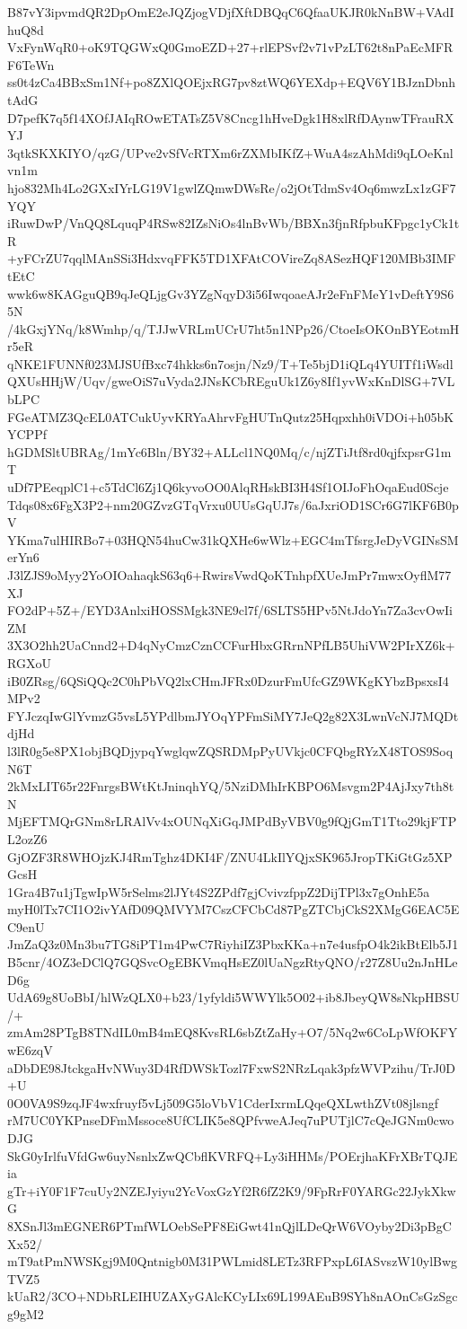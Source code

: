 B87vY3ipvmdQR2DpOmE2eJQZjogVDjfXftDBQqC6QfaaUKJR0kNnBW+VAdIhuQ8d
VxFynWqR0+oK9TQGWxQ0GmoEZD+27+rlEPSvf2v71vPzLT62t8nPaEcMFRF6TeWn
ss0t4zCa4BBxSm1Nf+po8ZXlQOEjxRG7pv8ztWQ6YEXdp+EQV6Y1BJznDbnhtAdG
D7pefK7q5f14XOfJAIqROwETATsZ5V8Cncg1hHveDgk1H8xlRfDAynwTFrauRXYJ
3qtkSKXKIYO/qzG/UPve2vSfVcRTXm6rZXMbIKfZ+WuA4szAhMdi9qLOeKnlvn1m
hjo832Mh4Lo2GXxIYrLG19V1gwlZQmwDWsRe/o2jOtTdmSv4Oq6mwzLx1zGF7YQY
iRuwDwP/VnQQ8LquqP4RSw82IZsNiOs4lnBvWb/BBXn3fjnRfpbuKFpgc1yCk1tR
+yFCrZU7qqlMAnSSi3HdxvqFFK5TD1XFAtCOVireZq8ASezHQF120MBb3IMFtEtC
wwk6w8KAGguQB9qJeQLjgGv3YZgNqyD3i56IwqoaeAJr2eFnFMeY1vDeftY9S65N
/4kGxjYNq/k8Wmhp/q/TJJwVRLmUCrU7ht5n1NPp26/CtoeIsOKOnBYEotmHr5eR
qNKE1FUNNf023MJSUfBxc74hkks6n7osjn/Nz9/T+Te5bjD1iQLq4YUITf1iWsdl
QXUsHHjW/Uqv/gweOiS7uVyda2JNsKCbREguUk1Z6y8If1yvWxKnDlSG+7VLbLPC
FGeATMZ3QcEL0ATCukUyvKRYaAhrvFgHUTnQutz25Hqpxhh0iVDOi+h05bKYCPPf
hGDMSltUBRAg/1mYc6Bln/BY32+ALLcl1NQ0Mq/c/njZTiJtf8rd0qjfxpsrG1mT
uDf7PEeqplC1+c5TdCl6Zj1Q6kyvoOO0AlqRHskBI3H4Sf1OIJoFhOqaEud0Scje
Tdqs08x6FgX3P2+nm20GZvzGTqVrxu0UUsGqUJ7s/6aJxriOD1SCr6G7lKF6B0pV
YKma7ulHIRBo7+03HQN54huCw31kQXHe6wWlz+EGC4mTfsrgJeDyVGINsSMerYn6
J3lZJS9oMyy2YoOIOahaqkS63q6+RwirsVwdQoKTnhpfXUeJmPr7mwxOyflM77XJ
FO2dP+5Z+/EYD3AnlxiHOSSMgk3NE9cl7f/6SLTS5HPv5NtJdoYn7Za3cvOwIiZM
3X3O2hh2UaCnnd2+D4qNyCmzCznCCFurHbxGRrnNPfLB5UhiVW2PIrXZ6k+RGXoU
iB0ZRsg/6QSiQQc2C0hPbVQ2lxCHmJFRx0DzurFmUfcGZ9WKgKYbzBpsxsI4MPv2
FYJczqIwGlYvmzG5vsL5YPdlbmJYOqYPFmSiMY7JeQ2g82X3LwnVcNJ7MQDtdjHd
l3lR0g5e8PX1objBQDjypqYwglqwZQSRDMpPyUVkjc0CFQbgRYzX48TOS9SoqN6T
2kMxLIT65r22FnrgsBWtKtJninqhYQ/5NziDMhIrKBPO6Msvgm2P4AjJxy7th8tN
MjEFTMQrGNm8rLRAlVv4xOUNqXiGqJMPdByVBV0g9fQjGmT1Tto29kjFTPL2ozZ6
GjOZF3R8WHOjzKJ4RmTghz4DKI4F/ZNU4LkIlYQjxSK965JropTKiGtGz5XPGcsH
1Gra4B7u1jTgwIpW5rSelms2lJYt4S2ZPdf7gjCvivzfppZ2DijTPl3x7gOnhE5a
myH0lTx7CI1O2ivYAfD09QMVYM7CszCFCbCd87PgZTCbjCkS2XMgG6EAC5EC9enU
JmZaQ3z0Mn3bu7TG8iPT1m4PwC7RiyhiIZ3PbxKKa+n7e4usfpO4k2ikBtElb5J1
B5cnr/4OZ3eDClQ7GQSvcOgEBKVmqHsEZ0lUaNgzRtyQNO/r27Z8Uu2nJnHLeD6g
UdA69g8UoBbI/hlWzQLX0+b23/1yfyldi5WWYlk5O02+ib8JbeyQW8sNkpHBSU/+
zmAm28PTgB8TNdIL0mB4mEQ8KvsRL6sbZtZaHy+O7/5Nq2w6CoLpWfOKFYwE6zqV
aDbDE98JtckgaHvNWuy3D4RfDWSkTozl7FxwS2NRzLqak3pfzWVPzihu/TrJ0D+U
0O0VA9S9zqJF4wxfruyf5vLj509G5loVbV1CderIxrmLQqeQXLwthZVt08jlsngf
rM7UC0YKPnseDFmMssoce8UfCLIK5e8QPfvweAJeq7uPUTjlC7cQeJGNm0cwoDJG
SkG0yIrlfuVfdGw6uyNsnlxZwQCbflKVRFQ+Ly3iHHMs/POErjhaKFrXBrTQJEia
gTr+iY0F1F7cuUy2NZEJyiyu2YcVoxGzYf2R6fZ2K9/9FpRrF0YARGc22JykXkwG
8XSnJl3mEGNER6PTmfWLOebSePF8EiGwt41nQjlLDeQrW6VOyby2Di3pBgCXx52/
mT9atPmNWSKgj9M0Qntnigb0M31PWLmid8LETz3RFPxpL6IASvszW10ylBwgTVZ5
kUaR2/3CO+NDbRLEIHUZAXyGAlcKCyLIx69L199AEuB9SYh8nAOnCsGzSgcg9gM2
